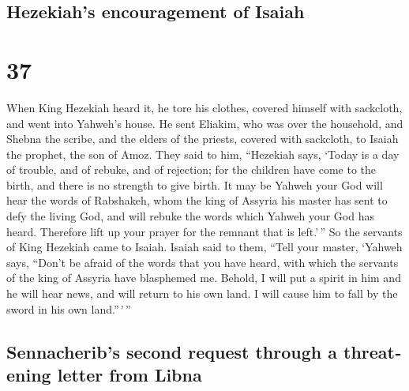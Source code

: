 \begin{paracol}{2}
\switchcolumn
\begin{otherlanguage}{english}

\hypertarget{hezekiahs-encouragement-of-isaiah}{%
\subsection{Hezekiah's encouragement of
Isaiah}\label{hezekiahs-encouragement-of-isaiah}}

\hypertarget{section-73}{%
\section{37}\label{section-73}}

 When King Hezekiah heard it, he tore his clothes, covered
himself with sackcloth, and went into Yahweh's house.  He
sent Eliakim, who was over the household, and Shebna the scribe, and the
elders of the priests, covered with sackcloth, to Isaiah the prophet,
the son of Amoz.  They said to him, ``Hezekiah says,
`Today is a day of trouble, and of rebuke, and of rejection; for the
children have come to the birth, and there is no strength to give birth.
 It may be Yahweh your God will hear the words of
Rabshakeh, whom the king of Assyria his master has sent to defy the
living God, and will rebuke the words which Yahweh your God has heard.
Therefore lift up your prayer for the remnant that is left.'\,''
 So the servants of King Hezekiah came to Isaiah.
 Isaiah said to them, ``Tell your master, `Yahweh says,
``Don't be afraid of the words that you have heard, with which the
servants of the king of Assyria have blasphemed me. 
Behold, I will put a spirit in him and he will hear news, and will
return to his own land. I will cause him to fall by the sword in his own
land.''\,'\,''

\hypertarget{sennacheribs-second-request-through-a-threatening-letter-from-libna}{%
\subsection{Sennacherib's second request through a threatening letter
from
Libna}\label{sennacheribs-second-request-through-a-threatening-letter-from-libna}}


\end{otherlanguage}
\end{paracol}
